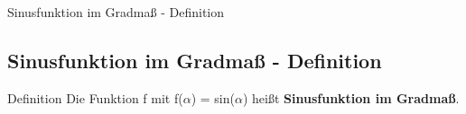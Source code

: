\documentclass{standalone}
\begin{document}
\begin{frame}
  \begin{center}
    Sinusfunktion im Gradma{\ss} - Definition
  \end{center}
  \subsection{Sinusfunktion im Gradma{\ss} - Definition}
\end{frame}

\begin{frame}{Definition}
  Die Funktion f mit f($\alpha$) = sin($\alpha$) hei{\ss}t \textbf{Sinusfunktion im Gradma{\ss}}.
\end{frame}
\end{document}
